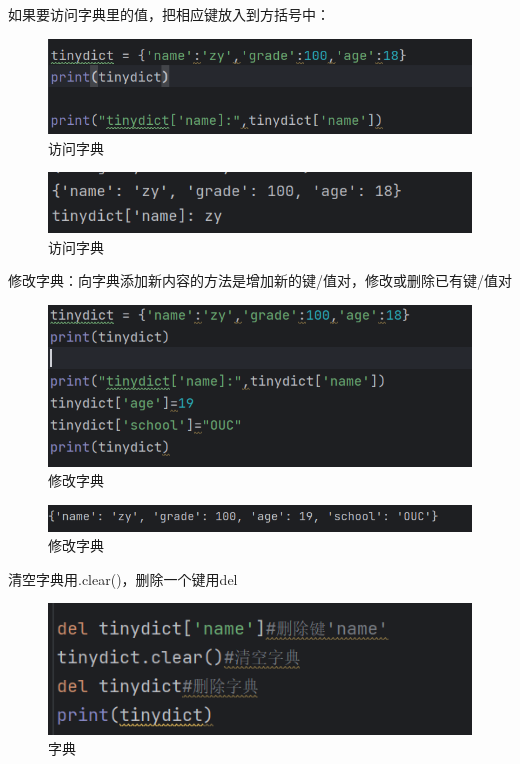 \documentclass{ctexart}
\begin{document}
	如果要访问字典里的值，把相应键放入到方括号中：
	
	\begin{figure}[H]
		\centering
		\includegraphics[scale=0.5]{3.44}
		\caption{访问字典}
	\end{figure}
	
	\begin{figure}[H]
		\centering
		\includegraphics[scale=0.5]{3.45}
		\caption{访问字典}
	\end{figure}
	
	
	修改字典：向字典添加新内容的方法是增加新的键/值对，修改或删除已有键/值对
	
	\begin{figure}[H]
		\centering
		\includegraphics[scale=0.5]{3.46}
		\caption{修改字典}
	\end{figure}
	
	\begin{figure}[H]
		\centering
		\includegraphics[scale=0.5]{3.47}
		\caption{修改字典}
	\end{figure}
	
	清空字典用.clear()，删除一个键用del
	
	\begin{figure}[H]
		\centering
		\includegraphics[scale=0.5]{3.48}
		\caption{字典}
	\end{figure}
	
\end{document}
